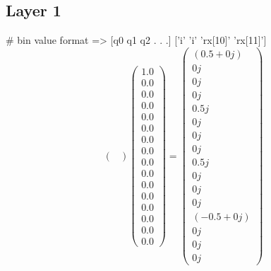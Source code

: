 \documentclass{article}%
\begin{document}
\subsection{Layer 1}%
\label{subsec:Layer1}%
\#  bin value format       => {[}q0 q1 q2 . . .{]}\newline%
%
{[}'i' 'i' 'rx{[}10{]}' 'rx{[}11{]}'{]}%
\[%
\begin{pmatrix}%
%
\end{pmatrix} \begin{pmatrix}%
1.0\\%
0.0\\%
0.0\\%
0.0\\%
0.0\\%
0.0\\%
0.0\\%
0.0\\%
0.0\\%
0.0\\%
0.0\\%
0.0\\%
0.0\\%
0.0\\%
0.0\\%
0.0%
\end{pmatrix} = \begin{pmatrix}%
(0.5+0j)\\%
0j\\%
0j\\%
0j\\%
0.5j\\%
0j\\%
0j\\%
0j\\%
0.5j\\%
0j\\%
0j\\%
0j\\%
(-0.5+0j)\\%
0j\\%
0j\\%
0j%
\end{pmatrix}%
\]

%
\end{document}

